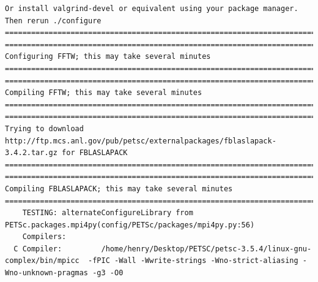 \documentclass{article}
\begin{document}
\begin{enumerate}
\begin{verbatim}
Or install valgrind-devel or equivalent using your package manager.                                                                                                                               
Then rerun ./configure                                                                                                                                                                           
===============================================================================                                                                                                                  
===============================================================================                                                                                                 
Configuring FFTW; this may take several minutes                                                                                                                                      
===============================================================================                                                                                                          
===============================================================================                                                                                                          
Compiling FFTW; this may take several minutes                                                                                                                                        
===============================================================================                                                                                                                        
===============================================================================                                                                                                                             
Trying to download http://ftp.mcs.anl.gov/pub/petsc/externalpackages/fblaslapack-3.4.2.tar.gz for FBLASLAPACK                                                                                       
===============================================================================                                                                                                                    
===============================================================================                                                                                                                    
Compiling FBLASLAPACK; this may take several minutes                                                                                                                                               
===============================================================================                                                                                                               
    TESTING: alternateConfigureLibrary from PETSc.packages.mpi4py(config/PETSc/packages/mpi4py.py:56)                                                                                              
    Compilers:
  C Compiler:         /home/henry/Desktop/PETSC/petsc-3.5.4/linux-gnu-complex/bin/mpicc  -fPIC -Wall -Wwrite-strings -Wno-strict-aliasing -Wno-unknown-pragmas -g3 -O0 
  

\end{verbatim}
\end{enumerate}
\end{document}
